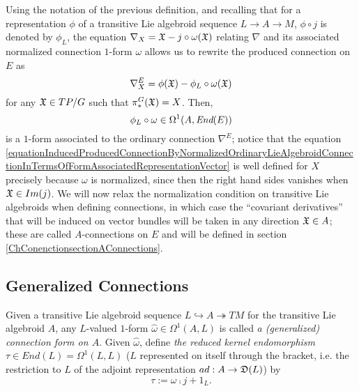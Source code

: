 Using the notation of the previous definition, and recalling that for a representation $\phi$ of a transitive Lie algebroid sequence $L \to A \to M$, $\phi \circ j$ is denoted by $\phi_L$, the equation $\nabla_X = \mathfrak{X} - j \circ \omega(\mathfrak{X})$ relating $\nabla$ and its associated normalized connection $1$-form $\omega$ allows us to rewrite the produced connection on $E$ as
\begin{equation}\label{equationInducedProducedConnectionByNormalizedOrdinaryLieAlgebroidConnectionInTermsOfFormAssociatedRepresentationVector}
    \nabla^E_X = \phi(\oid X) - \phi_L \circ \omega(\oid X)
\end{equation}
for any $\mathfrak{X} \in TP/G$ such that $\pi_*^G(\mathfrak{X}) = X$. Then, 
\begin{equation}
    \phi_L \circ \omega \in \Omega^1(A, \End(E))
\end{equation} 
is a $1$-form associated to the ordinary connection $\nabla^E$; notice that the equation \eqref{equationInducedProducedConnectionByNormalizedOrdinaryLieAlgebroidConnectionInTermsOfFormAssociatedRepresentationVector} is well defined for $X$ precisely because $\omega$ is normalized, since then the right hand sides vanishes when $\mathfrak{X} \in Im(j)$. We will now relax the normalization condition on transitive Lie algebroids when defining connections, in which case the ``covariant derivatives'' that will be induced on vector bundles will be taken in any direction $\mathfrak{X} \in A$; these are called $A$-connections on $E$ and will be defined in section \ref{ChConenctionsectionAConnections}.


\subsection{Generalized Connections}

\begin{definition}\label{definitionGeneralizedConnectionFOrmOnTransitiveLieAlgebroidAndTauReducedKernelEndomorphism}
Given a transitive Lie algebroid sequence $L \hookrightarrow A \twoheadrightarrow TM$ for the transitive Lie algebroid $A$, any $L$-valued $1$-form $\hat \omega \in \Omega^1(A, L)$ is called \emph{a (generalized) connection form on $A$}. Given $\hat \omega$, define \emph{the reduced kernel endomorphism $\tau \in End(L) = \Omega^1(L, L)$} ($L$ represented on itself through the bracket, i.e. the restriction to $L$ of the adjoint representation $ad:A \to \mathfrak{D}(L)$) 
 by
\begin{equation}
    \tau := \omega \comp j + 1_L.
\end{equation}
\end{definition}

